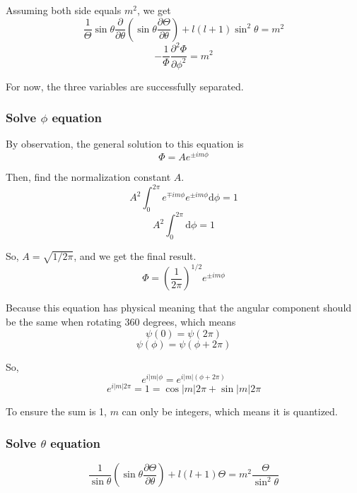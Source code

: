\documentclass[letterpaper]{article}
\newcommand{\pd}[2]{\frac{\partial #1}{\partial #2}}
\newcommand{\pdd}[2]{\frac{\partial^2 #1}{\partial #2^2}}
\newcommand{\diff}{\mathrm{d}}
\begin{document}
Assuming both side equals $m^2$, we get
\begin{equation*}
    \boxed{\frac{1}{\Theta}\sin\theta\pd{}{\theta}\left(\sin\theta\pd{\Theta}{\theta}\right)+
        l(l+1)\sin^2\theta=m^2}
\end{equation*}
\begin{equation*}
    \boxed{-\frac{1}{\Phi}\pdd{\Phi}{\phi}=m^2}
\end{equation*}

For now, the three variables are successfully separated.

\subsubsection*{Solve $\phi$ equation}
By observation, the general solution to this equation is
\begin{equation*}
    \Phi=Ae^{\pm im\phi}
\end{equation*}

Then, find the normalization constant $A$.
\begin{equation*}
    A^2\int_{0}^{2\pi}e^{\mp im\phi}e^{\pm im\phi}\diff\phi=1
\end{equation*}
\begin{equation*}
    A^2\int_{0}^{2\pi}\diff\phi=1
\end{equation*}

So, $A=\sqrt{1/2\pi}$, and we get the final result.
\begin{equation*}
    \boxed{\Phi=(\frac{1}{2\pi})^{1/2}e^{\pm im\phi}}
\end{equation*}

Because this equation has physical meaning that the angular component should be the same when
rotating 360 degrees, which means
\begin{equation*}
    \psi(0)=\psi(2\pi)
\end{equation*}
\begin{equation*}
    \psi(\phi)=\psi(\phi+2\pi)
\end{equation*}

So,
\begin{equation*}
    e^{i|m|\phi}=e^{i|m|(\phi+2\pi)}
\end{equation*}
\begin{equation*}
    e^{i|m|2\pi}=1=\cos|m|2\pi+\sin|m|2\pi
\end{equation*}

To ensure the sum is 1, $m$ can only be integers, which means it is quantized.
\subsubsection*{Solve $\theta$ equation}
\begin{equation*}
    \frac{1}{\sin\theta}\left(\sin\theta\pd{\Theta}{\theta}\right)+l(l+1)\Theta=
    m^2\frac{\Theta}{\sin^2\theta}
\end{equation*}
\end{document}
